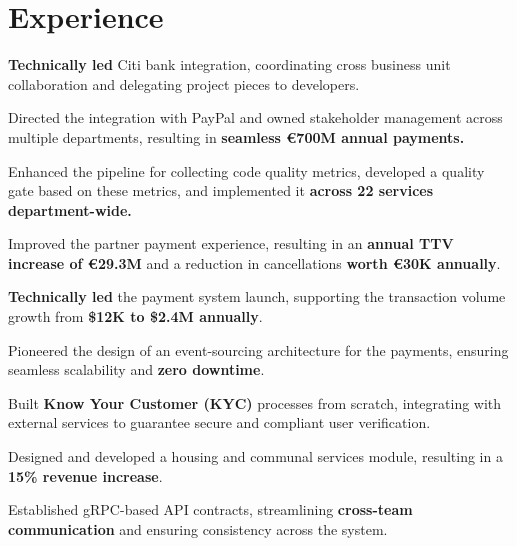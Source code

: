 \section{Experience}
\vspace{\topsep}

\vspace{\topsep}
\begin{tightemize}
    \item \textbf{Technically led} Citi bank integration, coordinating cross business unit collaboration and delegating project pieces to developers.

    \item Directed the integration with PayPal and owned stakeholder management across multiple departments, resulting in
    \textbf{seamless \euro 700M annual payments.}

    \item Enhanced the pipeline for collecting code quality metrics, developed a quality gate based on these metrics, and implemented it
    \textbf{across 22 services department-wide.}

    \item Improved the partner payment experience, resulting in an \textbf{annual TTV increase of \euro 29.3M} and a reduction in cancellations
    \textbf{worth \euro 30K annually}.
\end{tightemize}
\sectionsep


\begin{tightemize}
    \item \textbf{Technically led} the payment system launch, supporting the transaction volume growth from \textbf{\$12K to \$2.4M annually}.

    \item  Pioneered the design of an event-sourcing architecture for the payments, ensuring seamless scalability and \textbf{zero downtime}.

    \item  Built \textbf{Know Your Customer (KYC)} processes from scratch, integrating with external services to guarantee secure and compliant user
    verification.

    \item  Designed and developed a housing and communal services module, resulting in a \textbf{15\% revenue increase}.

    \item  Established gRPC-based API contracts, streamlining \textbf{cross-team communication} and ensuring consistency across the system.
\end{tightemize}
\sectionsep

